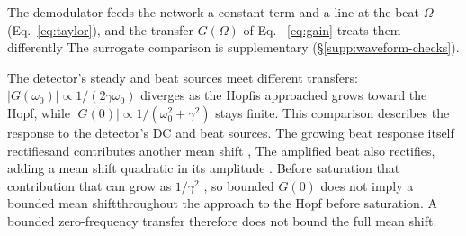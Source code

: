 \documentclass[11pt,a4paper]{article}
\providecommand{\DIFaddtex}[1]{{\protect\color{blue} \sf #1}} %
\providecommand{\DIFdeltex}[1]{{\protect\color{red} \scriptsize #1}} %
\providecommand{\DIFaddbegin}{} %
\providecommand{\DIFaddend}{} %
\providecommand{\DIFdelbegin}{} %
\providecommand{\DIFdelend}{} %
\providecommand{\DIFadd}[1]{\texorpdfstring{\DIFaddtex{#1}}{#1}} %
\providecommand{\DIFdel}[1]{\texorpdfstring{\DIFdeltex{#1}}{}} %
\begin{document}
\DIFdel{The demodulator feeds the network a constant term and a line at the beat $\Omega$
(Eq.~\eqref{eq:taylor}), and the transfer $G(\Omega)$ of Eq.
~\eqref{eq:gain} treats them
differently}\DIFdelend \DIFaddbegin \DIFadd{The surrogate
comparison is supplementary (\S\ref{supp:waveform-checks}).
}

\DIFadd{The detector's steady and beat sources meet different transfers}\DIFaddend :
$|G(\omega_0)|\propto1/(2\gamma\omega_0)$ \DIFdelbegin \DIFdel{diverges as the Hopfis approached}\DIFdelend \DIFaddbegin \DIFadd{grows toward the Hopf}\DIFaddend , while
$|G(0)|\propto1/(\omega_0^2+\gamma^2)$ stays finite. \DIFdelbegin \DIFdel{This comparison describes
the response to the detector's DC and beat sources. The growing beat
response
itself rectifiesand contributes another mean shift , }\DIFdelend \DIFaddbegin \DIFadd{The amplified beat
also rectifies, adding a mean shift }\DIFaddend quadratic in its amplitude \DIFdelbegin \DIFdel{.
Before saturation that contribution }\DIFdelend \DIFaddbegin \DIFadd{that }\DIFaddend can
grow as $1/\gamma^2$ \DIFdelbegin \DIFdel{, so bounded $G(0)$
does not imply a bounded mean shiftthroughout the approach to the Hopf}\DIFdelend \DIFaddbegin \DIFadd{before saturation. A bounded zero-frequency transfer
therefore does not bound the full mean shift}\DIFaddend .
\end{document}
